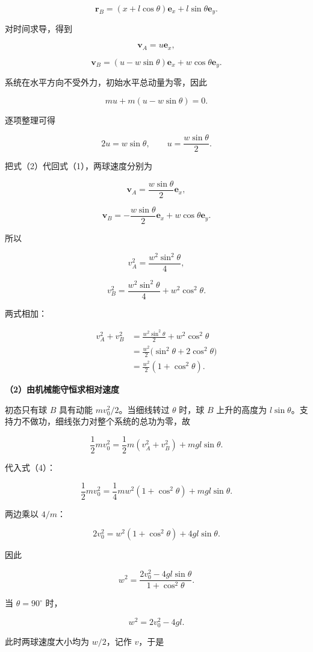 \documentclass[12pt,a4paper,UTF8]{ctexart}
\begin{document}
\[
\bm r_B=(x+l\cos\theta)\bm e_x+l\sin\theta\bm e_y.
\]

对时间求导，得到

\[
\bm v_A=u\bm e_x,
\]

\[
\bm v_B=(u-w\sin\theta)\bm e_x+w\cos\theta\bm e_y.
\tag{1}
\]

系统在水平方向不受外力，初始水平总动量为零，因此

\[
m u+m(u-w\sin\theta)=0.
\]

逐项整理可得

\[
2u=w\sin\theta,
\qquad
u=\frac{w\sin\theta}{2}.
\tag{2}
\]

把式（2）代回式（1），两球速度分别为

\[
\bm v_A=\frac{w\sin\theta}{2}\bm e_x,
\]

\[
\bm v_B=-\frac{w\sin\theta}{2}\bm e_x+w\cos\theta\bm e_y.
\tag{3}
\]

所以

\[
v_A^2=\frac{w^2\sin^2\theta}{4},
\]

\[
v_B^2=\frac{w^2\sin^2\theta}{4}+w^2\cos^2\theta.
\]

两式相加：

\[
\begin{aligned}
v_A^2+v_B^2
&=\frac{w^2\sin^2\theta}{2}+w^2\cos^2\theta\\
&=\frac{w^2}{2}\bigl(\sin^2\theta+2\cos^2\theta\bigr)\\
&=\frac{w^2}{2}(1+\cos^2\theta).
\end{aligned}
\tag{4}
\]

\textbf{（2）由机械能守恒求相对速度}

初态只有球 \(B\) 具有动能 \(mv_0^2/2\)。当细线转过 \(\theta\) 时，球
\(B\) 上升的高度为
\(l\sin\theta\)。支持力不做功，细线张力对整个系统的总功为零，故

\[
\frac12mv_0^2
=\frac12m(v_A^2+v_B^2)+mgl\sin\theta.
\]

代入式（4）：

\[
\frac12mv_0^2
=\frac14mw^2(1+\cos^2\theta)+mgl\sin\theta.
\]

两边乘以 \(4/m\)：

\[
2v_0^2=w^2(1+\cos^2\theta)+4gl\sin\theta.
\]

因此

\[
w^2=\frac{2v_0^2-4gl\sin\theta}{1+\cos^2\theta}.
\tag{5}
\]

当 \(\theta=90^\circ\) 时，

\[
w^2=2v_0^2-4gl.
\tag{6}
\]

此时两球速度大小均为 \(w/2\)，记作 \(v\)，于是
\end{document}
